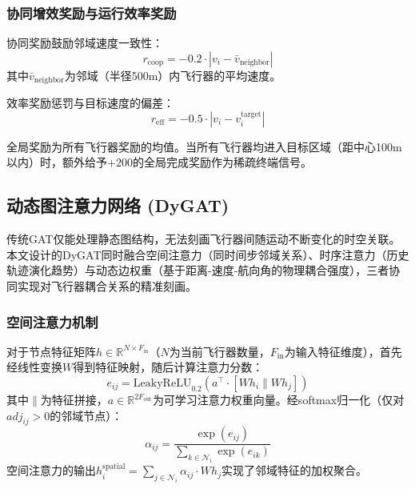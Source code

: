 \documentclass[12pt,a4paper,UTF8]{ctexart}
\begin{document}
\subsubsection{协同增效奖励与运行效率奖励}

协同奖励鼓励邻域速度一致性：
\begin{equation}
    r_{\text{coop}} = -0.2 \cdot |v_i - \bar{v}_{\text{neighbor}}|
    \label{eq:rcoop}
\end{equation}
其中$\bar{v}_{\text{neighbor}}$为邻域（半径500m）内飞行器的平均速度。

效率奖励惩罚与目标速度的偏差：
\begin{equation}
    r_{\text{eff}} = -0.5 \cdot |v_i - v_i^{\text{target}}|
    \label{eq:reff}
\end{equation}

全局奖励为所有飞行器奖励的均值。当所有飞行器均进入目标区域（距中心100m以内）时，额外给予$+200$的全局完成奖励作为稀疏终端信号。

\subsection{动态图注意力网络 (DyGAT)}

传统GAT仅能处理静态图结构，无法刻画飞行器间随运动不断变化的时空关联。本文设计的DyGAT同时融合空间注意力（同时间步邻域关系）、时序注意力（历史轨迹演化趋势）与动态边权重（基于距离-速度-航向角的物理耦合强度），三者协同实现对飞行器耦合关系的精准刻画。

\subsubsection{空间注意力机制}

对于节点特征矩阵$h \in \mathbb{R}^{N \times F_{\text{in}}}$（$N$为当前飞行器数量，$F_{\text{in}}$为输入特征维度），首先经线性变换$W$得到特征映射，随后计算注意力分数：
\begin{equation}
    e_{ij} = \text{LeakyReLU}_{0.2}\left(a^{\top} \cdot [Wh_i \parallel Wh_j]\right)
    \label{eq:spatial_attn}
\end{equation}
其中$\parallel$为特征拼接，$a \in \mathbb{R}^{2F_{\text{out}}}$为可学习注意力权重向量。经softmax归一化（仅对$adj_{ij} > 0$的邻域节点）：
\begin{equation}
    \alpha_{ij} = \frac{\exp(e_{ij})}{\sum_{k \in \mathcal{N}_i} \exp(e_{ik})}
    \label{eq:alpha}
\end{equation}
空间注意力的输出$h_i^{\text{spatial}} = \sum_{j \in \mathcal{N}_i} \alpha_{ij} \cdot Wh_j$实现了邻域特征的加权聚合。
\end{document}
